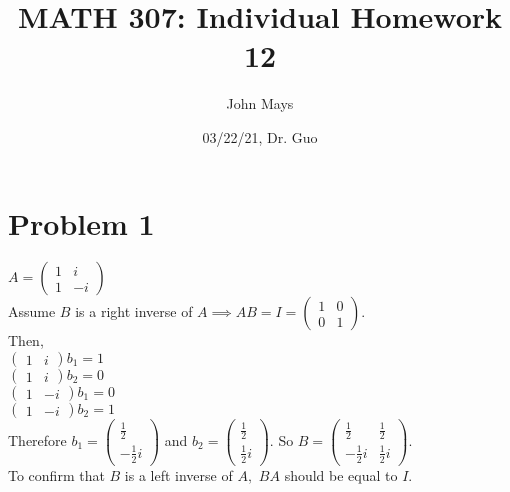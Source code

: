 \documentclass[fleqn]{article}
\title{\textbf{MATH 307: Individual Homework 12}}
\author{John Mays}
\date{03/22/21, Dr. Guo}
\begin{document}
\maketitle

\section*{Problem 1}
$A = \begin{pmatrix}1 & i \\ 1 & -i\end{pmatrix}$\\
Assume $B$ is a right inverse of $A \implies AB=I=\begin{pmatrix}1 & 0 \\ 0 & 1\end{pmatrix}. $\\ 
Then,\\
$\begin{pmatrix}1 & i\end{pmatrix}b_1=1$\\
$\begin{pmatrix}1 & i\end{pmatrix}b_2=0$\\
$\begin{pmatrix}1 & -i\end{pmatrix}b_1=0$\\
$\begin{pmatrix}1 & -i\end{pmatrix}b_2=1$\\
Therefore $b_1=\begin{pmatrix}\frac{1}{2}\\ -\frac{1}{2}i\end{pmatrix}$ and $b_2=\begin{pmatrix}\frac{1}{2}\\ \frac{1}{2}i\end{pmatrix}.$  So $B = \begin{pmatrix}\frac{1}{2} & \frac{1}{2}\\ -\frac{1}{2}i & \frac{1}{2}i\end{pmatrix}$.\\
\linebreak
To confirm that $B$ is a left inverse of $A,$ $BA$ should be equal to $I.$\\
\linebreak
\end{document}
